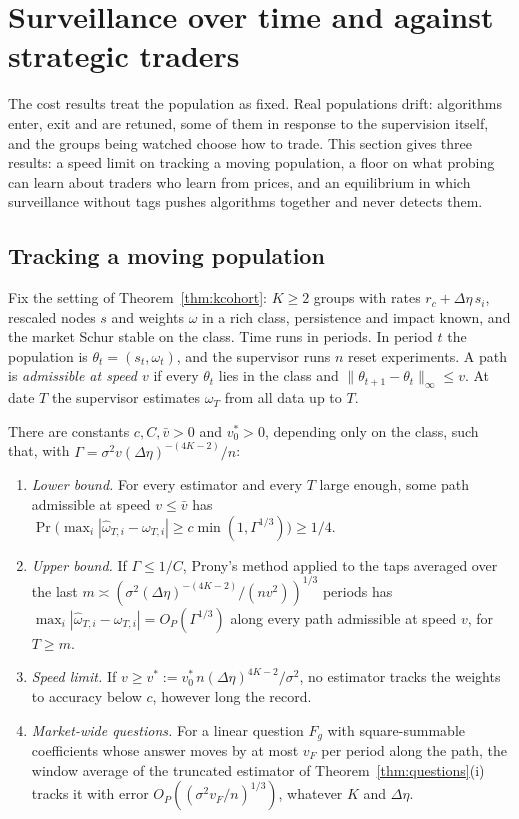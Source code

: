 \section{Surveillance over time and against strategic traders}\label{app:dynamic}

The cost results treat the population as fixed. Real populations drift: algorithms enter, exit and are retuned, some of them in response to the supervision itself, and the groups being watched choose how to trade. This section gives three results: a speed limit on tracking a moving population, a floor on what probing can learn about traders who learn from prices, and an equilibrium in which surveillance without tags pushes algorithms together and never detects them.

\subsection{Tracking a moving population}

Fix the setting of Theorem~\ref{thm:kcohort}: $K\ge2$ groups with rates $r_c+\Delta\eta\,s_i$, rescaled nodes $s$ and weights $\omega$ in a rich class, persistence and impact known, and the market Schur stable on the class. Time runs in periods. In period $t$ the population is $\theta_t=(s_t,\omega_t)$, and the supervisor runs $n$ reset experiments. A path is \emph{admissible at speed $v$} if every $\theta_t$ lies in the class and $\|\theta_{t+1}-\theta_t\|_\infty\le v$. At date $T$ the supervisor estimates $\omega_T$ from all data up to $T$.

\begin{theorem}\label{thm:track}
There are constants $c,C,\bar v>0$ and $v^*_0>0$, depending only on the class, such that, with $\Gamma=\sigma^2v(\Delta\eta)^{-(4K-2)}/n$:
\begin{enumerate}[label=(\roman*),itemsep=1pt]
\item \emph{Lower bound.} For every estimator and every $T$ large enough, some path admissible at speed $v\le\bar v$ has $\Pr\bigl(\max_i|\hat\omega_{T,i}-\omega_{T,i}|\ge c\min(1,\Gamma^{1/3})\bigr)\ge1/4$.
\item \emph{Upper bound.} If $\Gamma\le1/C$, Prony's method applied to the taps averaged over the last $m\asymp(\sigma^2(\Delta\eta)^{-(4K-2)}/(nv^2))^{1/3}$ periods has $\max_i|\hat\omega_{T,i}-\omega_{T,i}|=O_P(\Gamma^{1/3})$ along every path admissible at speed $v$, for $T\ge m$.
\item \emph{Speed limit.} If $v\ge v^*:=v^*_0\,n(\Delta\eta)^{4K-2}/\sigma^2$, no estimator tracks the weights to accuracy below $c$, however long the record.
\item \emph{Market-wide questions.} For a linear question $F_g$ with square-summable coefficients whose answer moves by at most $v_F$ per period along the path, the window average of the truncated estimator of Theorem~\ref{thm:questions}(i) tracks it with error $O_P((\sigma^2v_F/n)^{1/3})$, whatever $K$ and $\Delta\eta$.
\end{enumerate}
\end{theorem}

